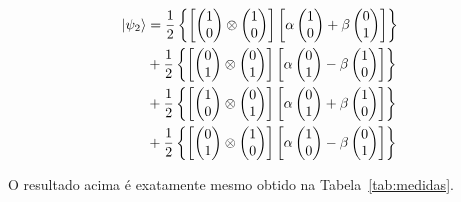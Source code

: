 \begin{equation}\label{eq:final}
  \begin{split}
\ket{\psi_2} &=\frac{1}{2} \left\{ \left[\begin{pmatrix}
1 \\
0
\end{pmatrix} \otimes \begin{pmatrix}
1 \\
0
\end{pmatrix}\right] \left[\alpha \begin{pmatrix}
1 \\
0
\end{pmatrix} + \beta \begin{pmatrix}
0 \\
1
\end{pmatrix}\right]\right\} \nonumber \\
&+\frac{1}{2} \left\{ \left[\begin{pmatrix}
0 \\
1
\end{pmatrix} \otimes \begin{pmatrix}
0 \\
1
\end{pmatrix}\right] \left[\alpha \begin{pmatrix}
0 \\
1
\end{pmatrix} - \beta \begin{pmatrix}
1 \\
0
\end{pmatrix}\right]\right\} \nonumber \\
&+\frac{1}{2} \left\{\left[ \begin{pmatrix}
1 \\
0
\end{pmatrix} \otimes \begin{pmatrix}
0 \\
1
\end{pmatrix}\right] \left[\alpha \begin{pmatrix}
0 \\
1
\end{pmatrix} + \beta \begin{pmatrix}
1 \\
0
\end{pmatrix}\right]\right\} \nonumber \\
&+\frac{1}{2} \left\{ \left[ \begin{pmatrix}
0 \\
1
\end{pmatrix} \otimes \begin{pmatrix}
1 \\
0
\end{pmatrix}\right] \left[\alpha \begin{pmatrix}
1 \\
0
\end{pmatrix} - \beta \begin{pmatrix}
0 \\
1
\end{pmatrix}\right] \right\}
  \end{split}
\end{equation}

O resultado acima é exatamente mesmo obtido na Tabela~\ref{tab:medidas}.

\clearpage



